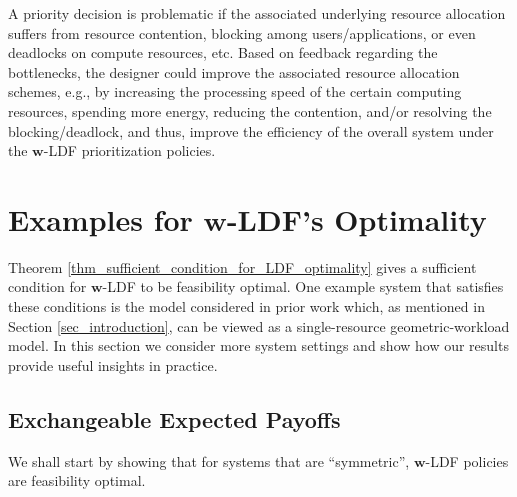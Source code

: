 \documentclass[prodmode,acmtompecs]{acmsmall}
\newcommand{\myComments}[1]{}
\newif\ifdissertation
\newcommand{\dissertationStart}{\ifdissertation  \myComments{Dissertation version: }}
\newcommand{\commentEnd}{\myComments{End}}
\begin{document}
A priority decision is problematic if the associated underlying resource allocation suffers from resource contention, blocking among users/applications, or even deadlocks on compute resources, etc. 
Based on feedback regarding the bottlenecks, the designer could improve the associated resource allocation schemes, e.g., by increasing the processing speed of the certain computing resources, spending more energy, reducing the contention, and/or resolving the blocking/deadlock, and thus, improve the efficiency of the overall system under the $\mathbf{w}$-LDF prioritization policies.  

\section{Examples for $\mathbf{w}$-LDF's Optimality}
Theorem \ref{thm_sufficient_condition_for_LDF_optimality} gives a sufficient condition for $\mathbf{w}$-LDF to be feasibility optimal. 
One example system that satisfies these conditions is the model considered in prior work \cite{HoK12} which, as mentioned in Section \ref{sec_introduction}, can be viewed as a single-resource geometric-workload model. 
In this section we consider more system settings and show how our results provide useful insights in practice. 
\dissertationStart
Theorem \ref{thm_sufficient_condition_for_LDF_optimality} gives us a sufficient condition for $\mathbf{w}$-LDF policies to be feasibility optimal. In this section we consider the soft real-time setting and discuss several examples that satisfy those conditions. 

Recall that in SRT setting users are periodically generating streams of tasks that need to complete before deadline and $\mathbf{p}(\mathbf{d})$ represents the expected number of tasks/sub-tasks completed on time, or the expected quality of task processing results per period under priority decision $\mathbf{d}$. To verify the conditions in Theorem \ref{thm_sufficient_condition_for_LDF_optimality}, we verify the subset payoff equivalence property. 
\commentEnd\fi

\subsection{Exchangeable Expected Payoffs}

We shall start by showing that for systems that are ``symmetric'', $\mathbf{w}$-LDF policies are feasibility optimal. 
\end{document}
